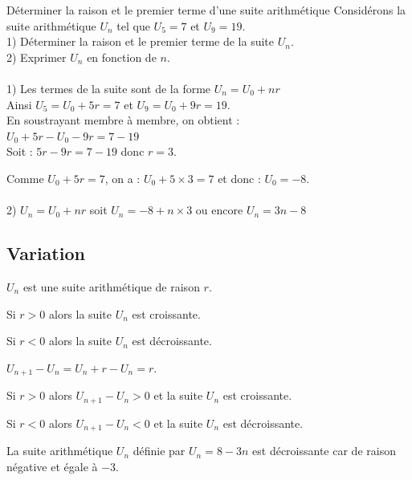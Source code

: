 \begin{methodeTitre}{Déterminer la raison et le premier terme d'une suite arithmétique}
    Considérons la suite arithmétique $U_n$ tel que $U_5=7$ et $U_9=19$.\\
    1) Déterminer la raison et le premier terme de la suite $U_n$.\\
    2) Exprimer $U_n$ en fonction de $n$.\\ 
    \\
    1) Les termes de la suite sont de la forme $U_n=U_0+nr$\\
    Ainsi 	$U_5=U_0+5r=7$  et $U_9=U_0+9r=19$.\\
    En soustrayant membre à membre, on obtient :\\ $U_0+5r-U_0-9r=7-19$\\
    Soit : $5r-9r=7-19$ donc $r=3$.
    
    Comme $U_0+5r=7$, on a : $U_0+5\times 3=7$ et donc : $U_0=-8$.\\
    \\
    2) $U_n=U_0+nr$  soit  $U_n=-8+n\times 3$ ou encore $U_n=3n-8$
\end{methodeTitre}

\subsection{Variation}

\begin{propriete}
    $U_n$ est une suite arithmétique de raison $r$.
    \begin{itemDef}
    	\item Si $r > 0$ alors la suite $U_n$ est croissante.
    	\item Si $r < 0$ alors la suite $U_n$ est décroissante.
    \end{itemDef}
\end{propriete}

\begin{demonstration}
    $U_{n+1}-U_n=U_n+r-U_n=r$.
    \begin{itemDem}
    	\item Si $r > 0$ alors $U_{n+1}-U_n>0$  et la suite $U_n$ est croissante.
    	\item Si $r < 0$ alors $U_{n+1}-U_n<0$ et la suite $U_n$ est décroissante.
    \end{itemDem}
\end{demonstration}
\begin{exemple}
    La suite arithmétique $U_n$ définie par $U_n=8-3n$ est décroissante car de raison négative et égale à $-3$.
\end{exemple}

